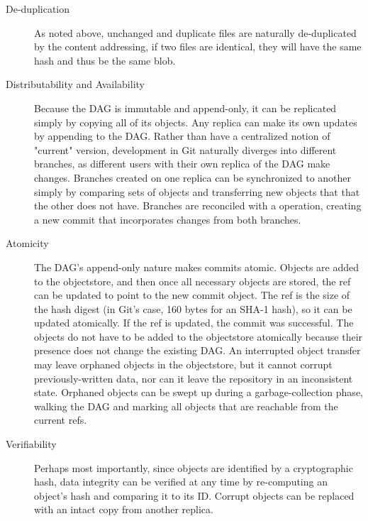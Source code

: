 \begin{description}

    \item[De-duplication] As noted above, unchanged and duplicate files are
        naturally de-duplicated by the content addressing, if two files are
        identical, they will have the same hash and thus be the same \gls{blob}.

    \item[Distributability and Availability] Because the \gls{DAG} is immutable
        and append-only, it can be replicated simply by copying all of its
        objects. Any replica can make its own updates by appending to the
        \gls{DAG}. Rather than have a centralized notion of "current" version,
        development in Git naturally diverges into different branches, as
        different users with their own replica of the \gls{DAG} make changes.
        Branches created on one replica can be synchronized to another simply by
        comparing sets of objects and transferring new objects that that the
        other does not have. Branches are reconciled with a 
        operation, creating a new \gls{commit} that incorporates changes from
        both branches.

    \item[Atomicity] The \gls{DAG}'s append-only nature makes \glspl{commit}
        atomic. Objects are added to the \gls{objectstore}, and then once all
        necessary objects are stored, the \gls{ref} can be updated to point to
        the new \gls{commit} object. The \gls{ref} is the size of the hash
        digest (in Git's case, \num{160} bytes for an SHA-1 hash), so it can be
        updated atomically. If the \gls{ref} is updated, the \gls{commit} was
        successful. The objects do not have to be added to the \gls{objectstore}
        atomically because their presence does not change the existing
        \gls{DAG}. An interrupted object transfer may leave orphaned objects in
        the \gls{objectstore}, but it cannot corrupt previously-written data,
        nor can it leave the repository in an inconsistent state. Orphaned
        objects can be swept up during a garbage-collection phase, walking the
        \gls{DAG} and marking all objects that are reachable from the current
        \glspl{ref}.

    \item[Verifiability] Perhaps most importantly, since objects are identified
        by a cryptographic hash, data integrity can be verified at any time by
        re-computing an object's hash and comparing it to its ID. Corrupt
        objects can be replaced with an intact copy from another replica.

\end{description}

